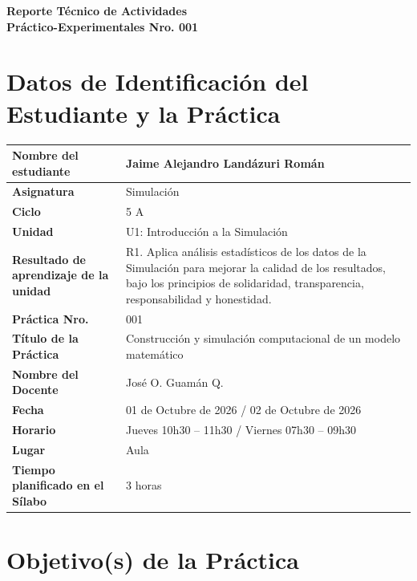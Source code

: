 \documentclass[11pt,a4paper]{article}
\begin{document}
\thispagestyle{fancy}

\vspace*{0.15cm}

\begin{center}
{\bfseries\fontsize{23}{26}\selectfont
Reporte T\'ecnico de Actividades\\
Pr\'actico-Experimentales Nro. 001\par}
\end{center}

\section{Datos de Identificaci\'on del Estudiante y la Pr\'actica}

\noindent
\begin{tabularx}{\textwidth}{|L{0.43\textwidth}|Y|}
\hline
\textbf{Nombre del estudiante} & Jaime Alejandro Land\'azuri Rom\'an \\ \hline
\textbf{Asignatura} & Simulaci\'on \\ \hline
\textbf{Ciclo} & 5 A \\ \hline
\textbf{Unidad} & U1: Introducci\'on a la Simulaci\'on \\ \hline
\textbf{Resultado de aprendizaje de la unidad} & R1. Aplica an\'alisis estad\'isticos de los
datos de la Simulaci\'on para mejorar la calidad de los resultados, bajo los principios de
solidaridad, transparencia, responsabilidad y honestidad. \\ \hline
\textbf{Pr\'actica Nro.} & 001 \\ \hline
\textbf{T\'itulo de la Pr\'actica} & Construcci\'on y simulaci\'on computacional de un
modelo matem\'atico \\ \hline
\textbf{Nombre del Docente} & Jos\'e O. Guam\'an Q. \\ \hline
\textbf{Fecha} & 01 de Octubre de 2026 / 02 de Octubre de 2026 \\ \hline
\textbf{Horario} & Jueves 10h30 -- 11h30 / Viernes 07h30 -- 09h30 \\ \hline
\textbf{Lugar} & Aula \\ \hline
\textbf{Tiempo planificado en el S\'ilabo} & 3 horas \\ \hline
\end{tabularx}

\section{Objetivo(s) de la Pr\'actica}
\end{document}
